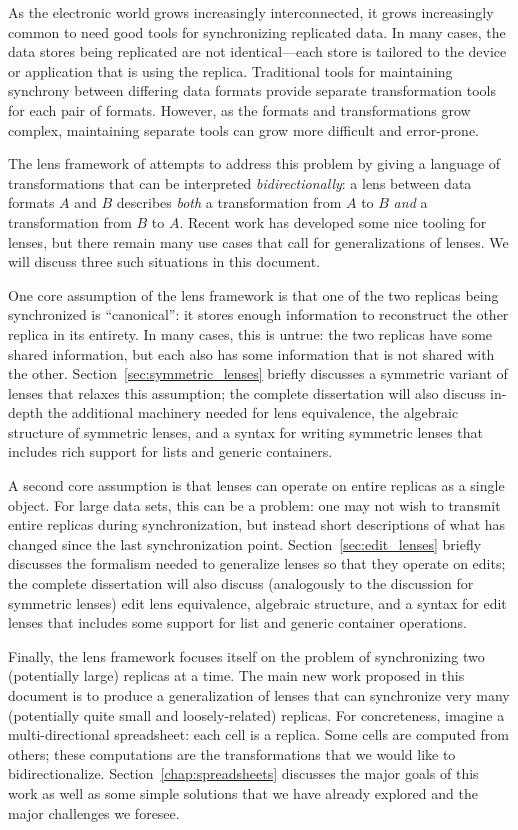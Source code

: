As the electronic world grows increasingly interconnected, it grows
increasingly common to need good tools for synchronizing replicated data. In
many cases, the data stores being replicated are not identical---each store
is tailored to the device or application that is using the replica.
Traditional tools for maintaining synchrony between differing data formats
provide separate transformation tools for each pair of formats. However, as
the formats and transformations grow complex, maintaining separate tools can
grow more difficult and error-prone.

The lens framework of \cite{FosterThesis} attempts to address this problem by giving a language of
transformations that can be interpreted \emph{bidirectionally}: a lens
between data formats $A$ and $B$ describes \emph{both} a transformation from
$A$ to $B$ \emph{and} a transformation from $B$ to $A$. Recent work has
developed some nice tooling for lenses, but there remain many use cases that
call for generalizations of lenses. We will discuss three such situations in
this document.

One core assumption of the lens framework is that one of the two replicas
being synchronized is ``canonical'': it stores enough information to
reconstruct the other replica in its entirety. In many cases, this is
untrue: the two replicas have some shared information, but each also has
some information that is not shared with the other.
Section~\ref{sec:symmetric_lenses} briefly discusses a symmetric variant of
lenses that relaxes this assumption; the complete dissertation will also
discuss in-depth the additional machinery needed for lens equivalence, the
algebraic structure of symmetric lenses, and a syntax for writing symmetric
lenses that includes rich support for lists and generic containers.

A second core assumption is that lenses can operate on entire replicas as a
single object. For large data sets, this can be a problem: one may not wish
to transmit entire replicas during synchronization, but instead short
descriptions of what has changed since the last synchronization point.
Section~\ref{sec:edit_lenses} briefly discusses the formalism needed to
generalize lenses so that they operate on edits; the complete dissertation
will also discuss (analogously to the discussion for symmetric lenses) edit
lens equivalence, algebraic structure, and a syntax for edit lenses that
includes some support for list and generic container operations.

Finally, the lens framework focuses itself on the problem of synchronizing
two (potentially large) replicas at a time. The main new work proposed in
this document is to produce a generalization of lenses that can synchronize
very many (potentially quite small and loosely-related) replicas. For
concreteness, imagine a multi-directional spreadsheet: each cell is a
replica. Some cells are computed from others; these computations are the
transformations that we would like to bidirectionalize.
Section~\ref{chap:spreadsheets} discusses the major goals of this work as
well as some simple solutions that we have already explored and the major
challenges we foresee.

